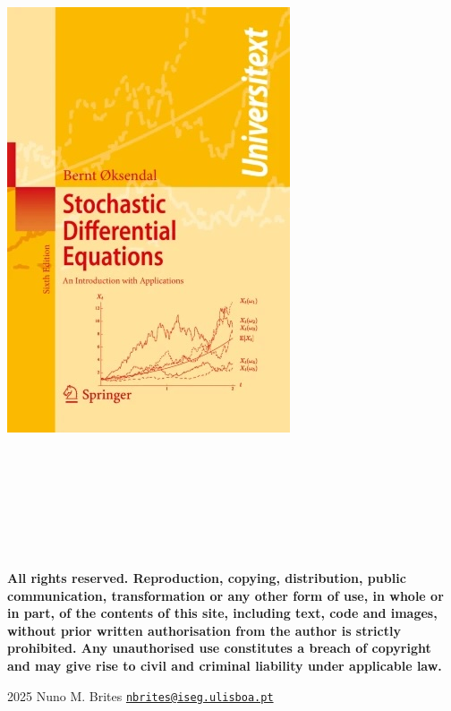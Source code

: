 \documentclass[
  11pt,
  a4paper,
]{book}
\theoremstyle{definition}
\theoremstyle{definition}
\theoremstyle{definition}
\theoremstyle{definition}
\theoremstyle{remark}
\begin{document}
\begin{center}\includegraphics[width=0.25\linewidth]{figures/book1} \end{center}

\vfill

\(\,\)

\(\,\)

\(\,\)

\(\,\)

\textbf{All rights reserved. Reproduction, copying, distribution, public communication, transformation or any other form of use, in whole or in part, of the contents of this site, including text, code and images, without prior written authorisation from the author is strictly prohibited. Any unauthorised use constitutes a breach of copyright and may give rise to civil and criminal liability under applicable law.}

2025 \textbar{} Nuno M. Brites \textbar{}
\href{mailto:nbrites@iseg.ulisboa.pt}{\nolinkurl{nbrites@iseg.ulisboa.pt}}
\end{document}
